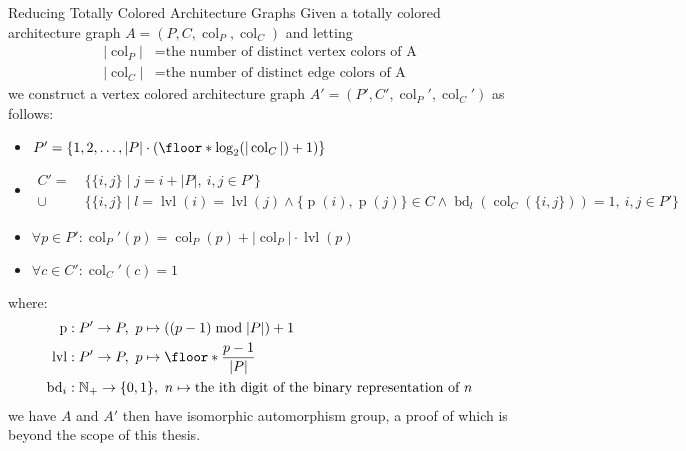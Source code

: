 \begin{thm}{Reducing Totally Colored Architecture Graphs}
  Given a totally colored architecture graph $A = (P, C, \operatorname{col}_P,
  \operatorname{col}_C)$ and letting
  \begin{align*}
    |\operatorname{col}_P| &= \text{the number of distinct vertex colors of A} \\
    |\operatorname{col}_C| &= \text{the number of distinct edge colors of A}
  \end{align*}
  we construct a vertex colored architecture graph $A' = (P', C',
  \operatorname{col}_P', \operatorname{col}_C')$ as follows:
  \begin{itemize}
    \item $P' = \{1, 2, \dots, |P| \cdot (\floor*{\log_2(|\operatorname{col}_C|)} + 1)\}$
    \item
      $\begin{aligned}
        C' =\ &\{\{i, j\} \mid j = i + |P|,\ i, j \in P'\} \\
        \cup\ &\{\{i, j\} \mid
          l = \operatorname{lvl}(i) = \operatorname{lvl}(j)
            \land
          \{\operatorname{p}(i), \operatorname{p}(j)\} \in C
            \land
          \operatorname{bd}_l(\operatorname{col}_C(\{i,j\})) = 1,\ i, j \in P'\}
      \end{aligned}$
    \item $\forall p \in P': \operatorname{col}_P'(p) =
      \operatorname{col}_P(p) + |\operatorname{col}_P| \cdot \operatorname{lvl}(p)$
    \item $\forall c \in C': \operatorname{col}_C'(c) = 1$
  \end{itemize}
  where:
  \begin{align*}
    \operatorname{p}&: P' \rightarrow P,\ p \mapsto ((p - 1) \bmod |P|) + 1 \\
    \operatorname{lvl}&: P' \rightarrow P,\ p \mapsto \floor*{\frac{p - 1}{|P|}} \\
    \operatorname{bd}_i&: \mathbb{N}_+ \rightarrow \{0,1\},\
    n \mapsto \text{the ith digit of the binary representation of } n
  \end{align*}
  we have
  $A$ and $A'$ then have isomorphic automorphism group, a proof of which is beyond
  the scope of this thesis.
\end{thm}

